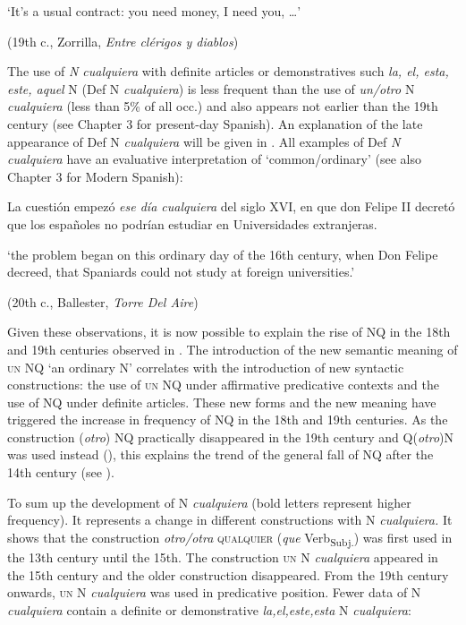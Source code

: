     ‘It’s a usual contract: you need money, I need you, …’

    (19th c., Zorrilla, \textit{Entre clérigos y diablos})

The use of \textit{N cualquiera} with definite articles or demonstratives such \textit{la, el, esta, este, aquel} N (Def N \textit{cualquiera}) is less frequent than the use of \textit{un/otro} N \textit{cualquiera} (less than 5\% of all occ.) and also appears not earlier than the 19th century (see Chapter 3 for present-day Spanish). An explanation of the late appearance of Def N \textit{cualquiera} will be given in . All examples of Def \textit{N cualquiera} have an evaluative interpretation of ‘common/ordinary’ (see also Chapter 3 for Modern Spanish):

  La cuestión empezó \textit{ese día cualquiera} del siglo XVI, en que don Felipe II decretó que los españoles no podrían estudiar en Universidades extranjeras.

  ‘the problem began on this ordinary day of the 16th century, when Don Felipe decreed, that Spaniards could not study at foreign universities.’ 

  (20th c., Ballester, \textit{Torre Del Aire})

Given these observations, it is now possible to explain the rise of NQ in the 18th and 19th centuries observed in . The introduction of the new semantic meaning of \textsc{un} NQ ‘an ordinary N’ correlates with the introduction of new syntactic constructions: the use of \textsc{un} NQ under affirmative predicative contexts and the use of NQ under definite articles. These new forms and the new meaning have triggered the increase in frequency of NQ in the 18th and 19th centuries. As the construction (\textit{otro}) NQ practically disappeared in the 19th century and Q(\textit{otro})N was used instead (), this explains the trend of the general fall of NQ after the 14th century (see ).

  To sum up the development of N \textit{cualquiera} (bold letters represent higher frequency). It represents a change in different constructions with N \textit{cualquiera.} It shows that the construction \textit{otro/otra} \textsc{qualquier} (\textit{que} Verb\textsubscript{Subj.}) was first used in the 13th century until the 15th. The construction \textsc{un} N \textit{cualquiera} appeared in the 15th century and the older construction disappeared. From the 19th century onwards, \textsc{un} N \textit{cualquiera} was used in predicative position. Fewer data of N \textit{cualquiera} contain a definite or demonstrative \textit{la,el,este,esta} N \textit{cualquiera}:

